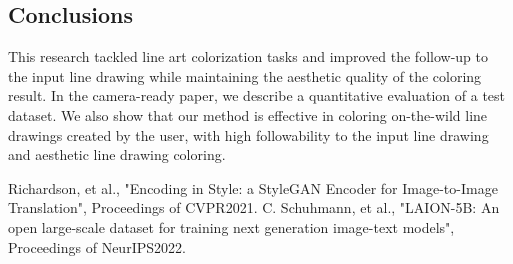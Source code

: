 \documentclass[a4paper]{article}
\newcommand{\aftersection}{\vspace{-5pt}}
\begin{document}
\begin{multicols}{2}
\section*{Conclusions}
\aftersection
This research tackled line art colorization tasks and improved the follow-up to the input line drawing while maintaining the aesthetic quality of the coloring result.
In the camera-ready paper, we describe a quantitative evaluation of a test dataset. We also show that our method is effective in coloring on-the-wild line drawings created by the user, with high followability to the input line drawing and aesthetic line drawing coloring.
\vspace{-10pt}
\begin{thebibliography}{2}
Richardson, et al., "Encoding in Style: a StyleGAN Encoder for Image-to-Image Translation", Proceedings of CVPR2021. 
C. Schuhmann, et al., "LAION-5B: An open large-scale dataset for training next generation image-text models", Proceedings of NeurIPS2022. 
\end{thebibliography}


\end{multicols}
\end{document}
